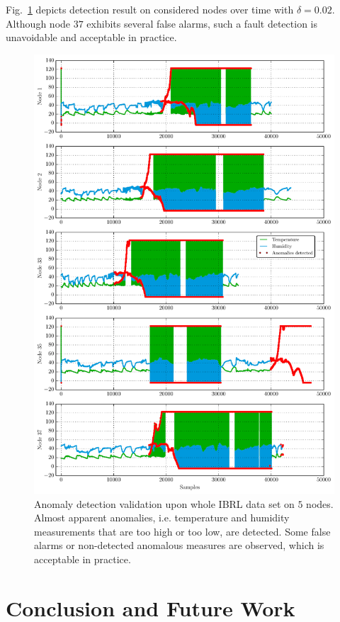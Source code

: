 \documentclass[conference]{IEEEtran}
\begin{document}
Fig.~\ref{fig:time_valid} depicts detection result on considered nodes over time with $\delta=0.02$. Although node $37$ exhibits several false alarms, such a fault detection is unavoidable and acceptable in practice.
\begin{figure}
\centering
\includegraphics[scale=.7]{Python/time_validation.pdf}
\caption{Anomaly detection validation upon whole IBRL data set on $5$ nodes. Almost apparent anomalies, i.e. temperature and humidity measurements that are too high or too low, are detected. Some false alarms or non-detected anomalous measures are observed, which is acceptable in practice.}
\label{fig:time_valid}
\end{figure}

\section{Conclusion and Future Work}\label{sec:concluding}



\end{document}
